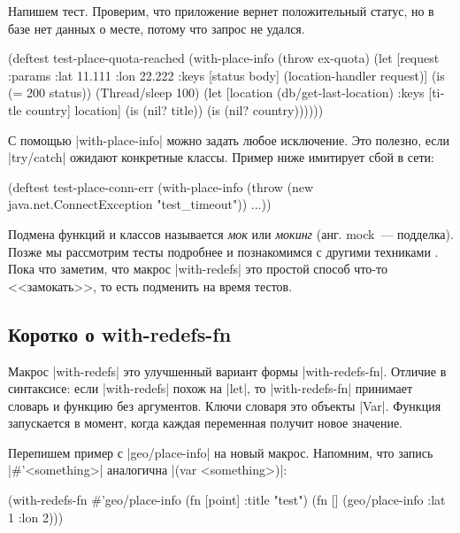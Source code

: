 \noindent
Напишем тест. Проверим, что приложение вернет положительный статус, но в базе
нет данных о месте, потому что запрос не удался.

\begin{english}
  \begin{clojure}
(deftest test-place-quota-reached
  (with-place-info (throw ex-quota)
    (let [request {:params {:lat 11.111 :lon 22.222}}
          {:keys [status body]} (location-handler request)]
      (is (= 200 status))
      (Thread/sleep 100)
      (let [location (db/get-last-location)
            {:keys [title country]} location]
        (is (nil? title))
        (is (nil? country))))))
  \end{clojure}
\end{english}

С помощью \spverb|with-place-info| можно задать любое исключение. Это полезно,
если \spverb|try/catch| ожидают конкретные классы. Пример ниже имитирует сбой в
сети:

\begin{english}
  \begin{clojure}
(deftest test-place-conn-err
  (with-place-info
    (throw (new java.net.ConnectException "test_timeout"))
    ...))
  \end{clojure}
\end{english}

Подмена функций и классов называется \emph{мок} или \emph{мокинг} (анг. mock~---
подделка). Позже мы рассмотрим тесты подробнее и познакомимся с другими
техниками . Пока что заметим, что макрос
\spverb|with-redefs| это простой способ что-то <<замокать>>, то есть подменить
на время тестов.

\subsection{Коротко о with-redefs-fn}

Макрос \spverb|with-redefs| это улучшенный вариант формы
\spverb|with-redefs-fn|. Отличие в синтаксисе: если \spverb|with-redefs| похож
на \spverb|let|, то \spverb|with-redefs-fn| принимает словарь и функцию без
аргументов. Ключи словаря это объекты \spverb|Var|. Функция запускается в
момент, когда каждая переменная получит новое значение.

Перепишем пример с \spverb|geo/place-info| на новый макрос. Напомним, что запись
\spverb|#'<something>| аналогична \spverb|(var <something>)|:

\begin{english}
  \begin{clojure}
(with-redefs-fn
  {#'geo/place-info (fn [point] {:title "test"})}
  (fn []
    (geo/place-info {:lat 1 :lon 2})))
  \end{clojure}
\end{english}

